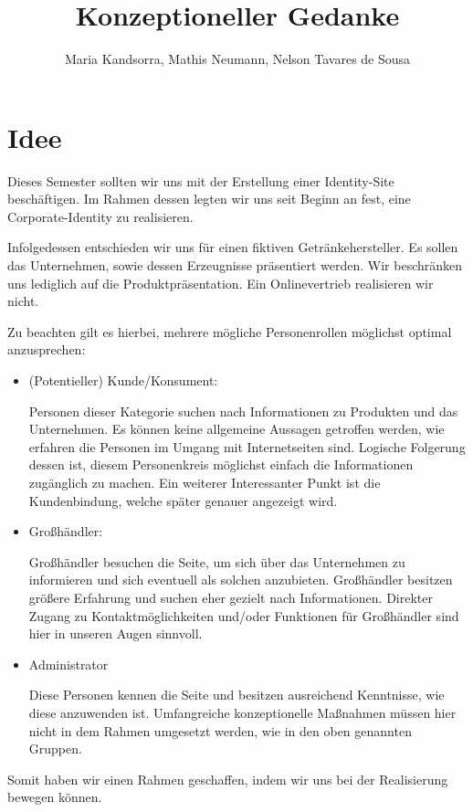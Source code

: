 \documentclass[12pt,a4paper,oneside,ngerman]{article}
\begin{document}
\title{Konzeptioneller Gedanke} %
\author{Maria Kandsorra, Mathis Neumann, Nelson Tavares de Sousa}
\maketitle
\newpage

\tableofcontents

%
%
%
%

\newpage

\section{Idee}
Dieses Semester sollten wir uns mit der Erstellung einer Identity-Site beschäftigen.
Im Rahmen dessen legten wir uns seit Beginn an fest, eine Corporate-Identity zu realisieren.

Infolgedessen entschieden wir uns für einen fiktiven Getränkehersteller. Es sollen das Unternehmen, sowie dessen Erzeugnisse präsentiert werden. Wir beschränken uns lediglich auf die Produktpräsentation. Ein Onlinevertrieb realisieren wir nicht.

 Zu beachten gilt es hierbei, mehrere mögliche Personenrollen möglichst optimal anzusprechen:
\begin{itemize}
\item (Potentieller) Kunde/Konsument:

Personen dieser Kategorie suchen nach Informationen zu Produkten und das Unternehmen. Es können keine allgemeine Aussagen getroffen werden, wie erfahren die Personen im Umgang mit Internetseiten sind. Logische Folgerung dessen ist, diesem Personenkreis möglichst einfach die Informationen zugänglich zu machen. Ein weiterer Interessanter Punkt ist die Kundenbindung, welche später genauer angezeigt wird.
\item Großhändler:

Großhändler besuchen die Seite, um sich über das Unternehmen zu informieren und sich eventuell als solchen anzubieten. Großhändler besitzen größere Erfahrung und suchen eher gezielt nach Informationen. Direkter Zugang zu Kontaktmöglichkeiten und/oder Funktionen für Großhändler sind hier in unseren Augen sinnvoll.
\item Administrator

Diese Personen kennen die Seite und besitzen ausreichend Kenntnisse, wie diese anzuwenden ist.
Umfangreiche konzeptionelle Maßnahmen müssen hier nicht in dem Rahmen umgesetzt werden, wie in den oben genannten Gruppen.
\end{itemize}
Somit haben wir einen Rahmen geschaffen, indem wir uns bei der Realisierung bewegen können.
\end{document}
